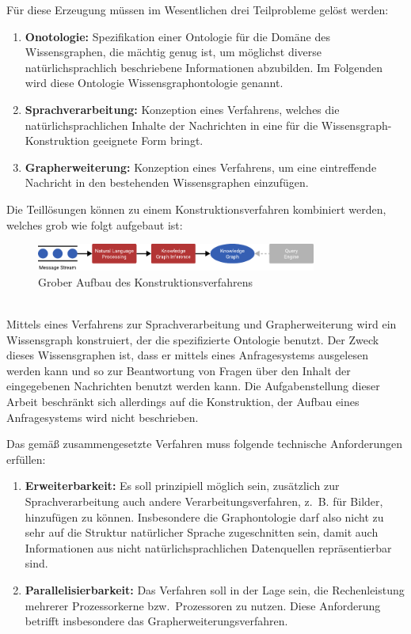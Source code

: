 Für diese Erzeugung müssen im Wesentlichen drei Teilprobleme gelöst werden:
\begin{enumerate}
	\item \textbf{Onotologie:}
		Spezifikation einer Ontologie für die Domäne des Wissensgraphen, die mächtig genug ist, um möglichst diverse natürlichsprachlich beschriebene Informationen abzubilden.
		Im Folgenden wird diese Ontologie Wissensgraphontologie genannt.
	\item \textbf{Sprachverarbeitung:}
		Konzeption eines Verfahrens, welches die natürlichsprachlichen Inhalte der Nachrichten in eine für die Wissensgraph-Konstruktion geeignete Form bringt.
	\item \textbf{Grapherweiterung:}
		Konzeption eines Verfahrens, um eine eintreffende Nachricht in den bestehenden Wissensgraphen einzufügen.
\end{enumerate}
Die Teillösungen können zu einem Konstruktionsverfahren kombiniert werden, welches grob wie folgt aufgebaut ist:
\begin{figure}[h]
	\centering
	\includegraphics[width=0.82\textwidth]{gfx/introduction/overview.pdf}
	\caption{Grober Aufbau des Konstruktionsverfahrens}\label{fig:intro:overview}
\end{figure} \\
Mittels eines Verfahrens zur Sprachverarbeitung und Grapherweiterung wird ein Wissensgraph konstruiert, der die spezifizierte Ontologie benutzt.
Der Zweck dieses Wissensgraphen ist, dass er mittels eines Anfragesystems ausgelesen werden kann und so zur Beantwortung von Fragen über den Inhalt der eingegebenen Nachrichten benutzt werden kann.
Die Aufgabenstellung dieser Arbeit beschränkt sich allerdings auf die Konstruktion, der Aufbau eines Anfragesystems wird nicht beschrieben.

Das gemäß  zusammengesetzte Verfahren muss folgende technische Anforderungen erfüllen:
\begin{enumerate}
	\item \textbf{Erweiterbarkeit:}
		Es soll prinzipiell möglich sein, zusätzlich zur Sprachverarbeitung auch andere Verarbeitungsverfahren, z.~B. für Bilder, hinzufügen zu können.
		Insbesondere die Graphontologie darf also nicht zu sehr auf die Struktur natürlicher Sprache zugeschnitten sein, damit auch Informationen aus nicht natürlichsprachlichen Datenquellen repräsentierbar sind.
	\item \textbf{Parallelisierbarkeit:}
		Das Verfahren soll in der Lage sein, die Rechenleistung mehrerer Prozessorkerne bzw.\ Prozessoren zu nutzen.
		Diese Anforderung betrifft insbesondere das Grapherweiterungsverfahren.
\end{enumerate}

